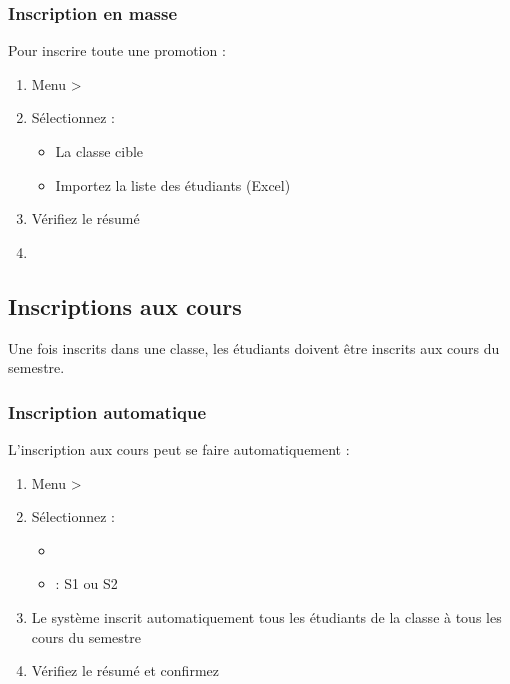 \subsubsection{Inscription en masse}

Pour inscrire toute une promotion :

\begin{enumerate}[leftmargin=*]
    \item Menu  > 
    \item Sélectionnez :
    \begin{itemize}
        \item La classe cible
        \item Importez la liste des étudiants (Excel)
    \end{itemize}
    \item Vérifiez le résumé
    \item {}
\end{enumerate}

\subsection{Inscriptions aux cours}

Une fois inscrits dans une classe, les étudiants doivent être inscrits aux cours du semestre.

\subsubsection{Inscription automatique}

L'inscription aux cours peut se faire automatiquement :

\begin{enumerate}[leftmargin=*]
    \item Menu  > 
    \item Sélectionnez :
    \begin{itemize}
        \item {}
        \item {} : S1 ou S2
    \end{itemize}
    \item Le système inscrit automatiquement tous les étudiants de la classe à tous les cours du semestre
    \item Vérifiez le résumé et confirmez
\end{enumerate}

